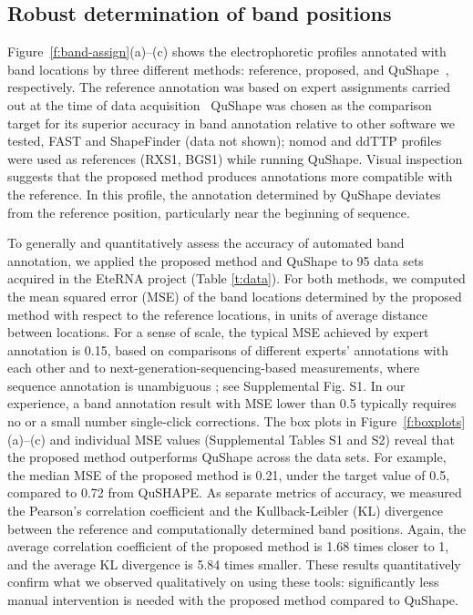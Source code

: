 \newcommand{\bP}{{\mathbf{P}}}

\subsection{Robust determination of band positions}\label{ss:band-position}
Figure~\ref{f:band-assign}(a)--(c) shows the electrophoretic profiles annotated with band locations by three different methods: reference, proposed, and QuShape~\citep{Karabiber2013}, respectively. The reference annotation was based on expert assignments carried out at the time of data acquisition~\citep{lee2014eterna} QuShape was chosen as the comparison target for its superior accuracy in band annotation relative to other software we tested, FAST and ShapeFinder (data not shown); nomod and ddTTP profiles were used as references (RXS1, BGS1) while running QuShape. Visual inspection suggests that the proposed method produces annotations more compatible with the reference. In this profile, the annotation determined by QuShape deviates from the reference position, particularly near the beginning of sequence.

To generally and quantitatively assess the accuracy of automated band annotation, we applied the proposed method and QuShape to 95 data sets acquired in the EteRNA project (Table \ref{t:data}). For both methods, we computed the mean squared error (MSE) of the band locations determined by the proposed method with respect to the reference locations, in units of average distance between locations. For a sense of scale, the typical MSE achieved by expert annotation is 0.15, based on comparisons of different experts' annotations with each other and to next-generation-sequencing-based measurements, where sequence annotation is unambiguous \citep{Kladwang2014}; see Supplemental Fig. S1. In our experience, a band annotation result with MSE lower than 0.5 typically requires no or a small number single-click corrections. The box plots in Figure~\ref{f:boxplots}(a)--(c) and individual MSE values (Supplemental Tables S1 and S2) reveal that the proposed method outperforms QuShape across the data sets. For example, the median MSE of the proposed method is 0.21, under the target value of 0.5, compared to 0.72 from QuSHAPE. As separate metrics of accuracy, we measured the Pearson's correlation coefficient and the Kullback-Leibler (KL) divergence between the reference and computationally determined band positions.  Again, the average correlation coefficient of the proposed method is 1.68 times closer to 1, and the average KL divergence is 5.84 times smaller. These results quantitatively confirm what we observed qualitatively on using these tools: significantly less manual intervention is needed with the proposed method compared to QuShape.

